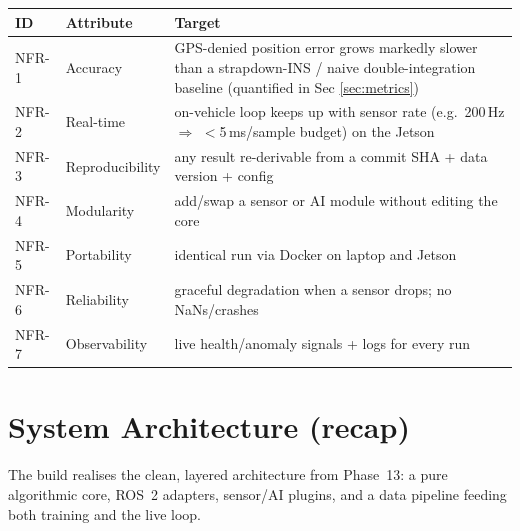 \documentclass[11pt]{article}
\begin{document}
\begin{center}\footnotesize
\begin{tabular}{@{}p{1.3cm}p{4.0cm}p{7.0cm}@{}}
\toprule
\textbf{ID} & \textbf{Attribute} & \textbf{Target}\\
\midrule
NFR-1 & Accuracy & GPS-denied position error grows markedly slower than a strapdown-INS / naive double-integration baseline (quantified in Sec \ref{sec:metrics})\\
NFR-2 & Real-time & on-vehicle loop keeps up with sensor rate (e.g.\ 200\,Hz $\Rightarrow$ $<$5\,ms/sample budget) on the Jetson\\
NFR-3 & Reproducibility & any result re-derivable from a commit SHA + data version + config\\
NFR-4 & Modularity & add/swap a sensor or AI module without editing the core\\
NFR-5 & Portability & identical run via Docker on laptop and Jetson\\
NFR-6 & Reliability & graceful degradation when a sensor drops; no NaNs/crashes\\
NFR-7 & Observability & live health/anomaly signals + logs for every run\\
\bottomrule
\end{tabular}
\end{center}

\section{System Architecture (recap)}\label{sec:arch}

The build realises the clean, layered architecture from Phase~13: a pure algorithmic core,
ROS~2 adapters, sensor/AI plugins, and a data pipeline feeding both training and the live loop.
\end{document}
